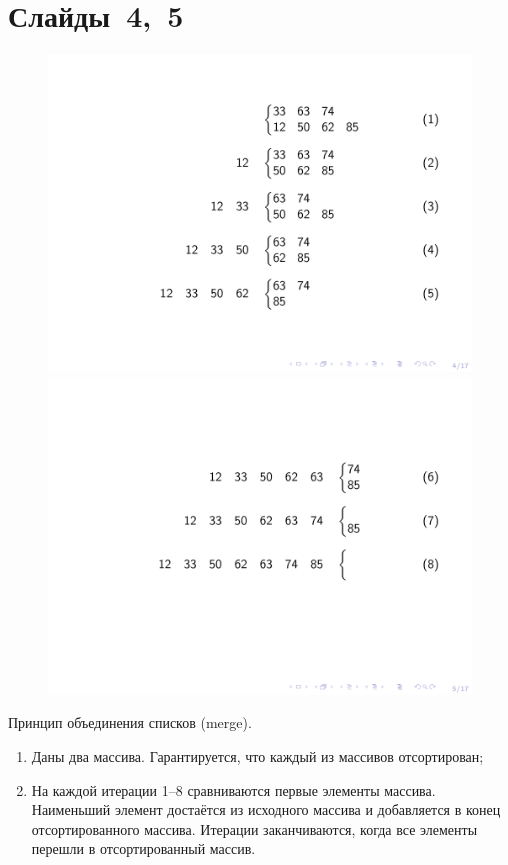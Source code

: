 \documentclass[aps,pre,reprint]{revtex4-2}
\begin{document}
	\section{Слайды~4,~5}
	\begin{figure}[H]
		\includegraphics[scale=.7]{presentation-04.png}
		\includegraphics[scale=.7]{presentation-05.png}
	\end{figure}
	
	Принцип объединения списков (merge).
	
	\begin{enumerate}
		\item Даны два массива. Гарантируется, что каждый из массивов отсортирован;
		\item На каждой итерации 1--8 сравниваются первые элементы массива. Наименьший элемент достаётся из исходного массива и добавляется в конец отсортированного массива. Итерации заканчиваются, когда все элементы перешли в отсортированный массив.
	\end{enumerate}
\end{document}
